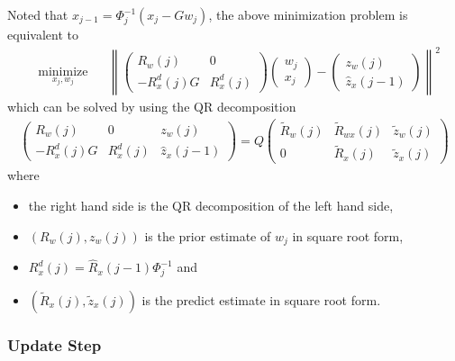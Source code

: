 \documentclass[microtype]{gtpart}     %
\theoremstyle{definition}
\newcommand{\norm}[1]{\left\lVert#1\right\rVert}
\begin{document}
Noted that $x_{j-1} = \Phi^{-1}_j(x_j - Gw_j)$, the above minimization problem is equivalent to
\begin{align*}
	& \underset{x_j, w_j}{\text{minimize}} & &\norm{
		\begin{pmatrix}
		R_w(j) &0 \\
		-R^d_x(j)G &R^d_x(j)
		\end{pmatrix}
		\begin{pmatrix}
		w_j \\ x_j
		\end{pmatrix} - \begin{pmatrix}
		z_w(j) \\ \hat{z}_x(j-1)
		\end{pmatrix}}^2
\end{align*}
which can be solved by using the QR decomposition
\begin{align*}
	\begin{pmatrix}
		R_w(j) &0 &z_w(j) \\ 
		-R^d_x(j)G &R^d_x(j) &\hat{z}_x(j-1)
	\end{pmatrix} = Q
	\begin{pmatrix}
		\tilde{R}_w(j) &\tilde{R}_{wx}(j) &\tilde{z}_w(j) \\ 0 &\tilde{R}_x(j) &\tilde{z}_x(j)
	\end{pmatrix}
\end{align*}
where
\begin{itemize}
	\item the right hand side is the QR decomposition of the left hand side,
	\item $(R_w(j), z_w(j))$ is the prior estimate of $w_j$ in square root form,
	\item $R^d_x(j)=\hat{R}_x(j-1)\Phi^{-1}_j$ and
	\item $(\tilde{R}_x(j), \tilde{z}_x(j))$ is the predict estimate in square root form.
\end{itemize}

\subsubsection{Update Step}
\end{document}
